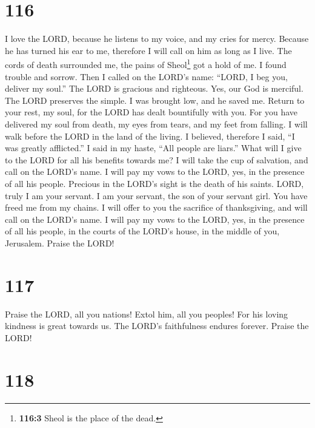 \hypertarget{section-108}{%
\section{116}\label{section-108}}

 I love the LORD, because he listens to my voice, and my
cries for mercy.  Because he has turned his ear to me,
therefore I will call on him as long as I live.  The cords
of death surrounded me, the pains of Sheol\footnote{\textbf{116:3} Sheol
  is the place of the dead.} got a hold of me. I found trouble and
sorrow.  Then I called on the LORD's name: ``LORD, I beg
you, deliver my soul.''  The LORD is gracious and
righteous. Yes, our God is merciful.  The LORD preserves
the simple. I was brought low, and he saved me.  Return to
your rest, my soul, for the LORD has dealt bountifully with you.
 For you have delivered my soul from death, my eyes from
tears, and my feet from falling.  I will walk before the
LORD in the land of the living.  I believed, therefore I
said, ``I was greatly afflicted.''  I said in my haste,
``All people are liars.''  What will I give to the LORD
for all his benefits towards me?  I will take the cup of
salvation, and call on the LORD's name.  I will pay my
vows to the LORD, yes, in the presence of all his people.
 Precious in the LORD's sight is the death of his saints.
 LORD, truly I am your servant. I am your servant, the
son of your servant girl. You have freed me from my chains.
 I will offer to you the sacrifice of thanksgiving, and
will call on the LORD's name.  I will pay my vows to the
LORD, yes, in the presence of all his people,  in the
courts of the LORD's house, in the middle of you, Jerusalem. Praise the
LORD!

\hypertarget{section-109}{%
\section{117}\label{section-109}}

 Praise the LORD, all you nations! Extol him, all you
peoples!  For his loving kindness is great towards us. The
LORD's faithfulness endures forever. Praise the LORD!

\hypertarget{section-110}{%
\section{118}\label{section-110}}

